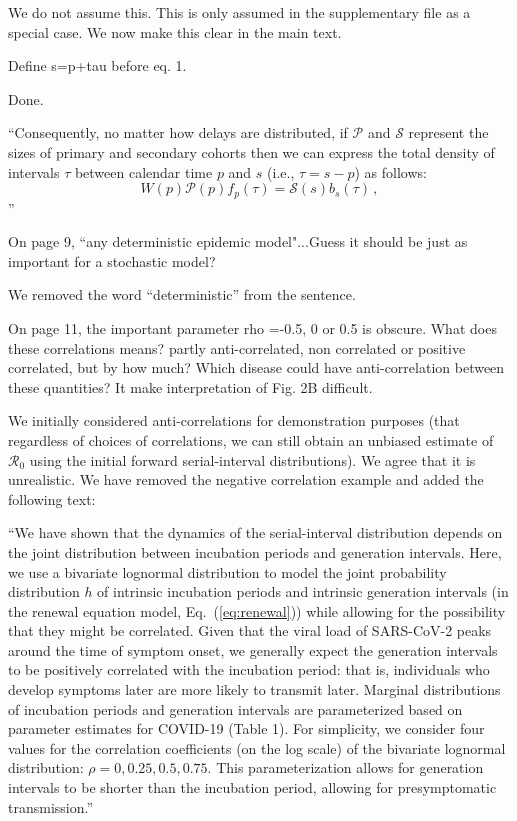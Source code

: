 \documentclass[12pt]{article}
\newcommand{\eref}[1]{Eq.~(\ref{eq:#1})}
\newcommand{\Ro}{\ensuremath{{\mathcal R}_{0}}\xspace}
\newcommand{\revtext}{\textsf}
\newcommand{\psymp}{\ensuremath{p}} %
\newcommand{\ssymp}{\ensuremath{s}} %
\newcommand{\psize}{{\mathcal P}} %
\newcommand{\ssize}{{\mathcal S}} %
\begin{document}
We do not assume this. This is only assumed in the supplementary file as a special case. We now make this clear in the main text.

\revtext{Define s=p+tau before eq. 1.}

Done.

``Consequently, no matter how delays are distributed, if
$\mathcal P$ and $\mathcal S$ represent the sizes of primary and
secondary cohorts then we can express the total density of intervals $\tau$ between calendar time $\psymp$ and $\ssymp$ (i.e., $\tau=\ssymp-\psymp$) as follows:
\begin{equation}
W(\psymp) \psize(\psymp) f_\psymp(\tau) = \ssize(\ssymp) b_\ssymp(\tau) \,,
\label{eq:match}
\end{equation}''

\revtext{On page 9, ``any deterministic epidemic model"...Guess it should be just as important for a stochastic model?}

We removed the word ``deterministic'' from the sentence.

\revtext{On page 11, the important parameter rho =-0.5, 0 or 0.5 is obscure. What does these correlations means? partly anti-correlated, non correlated or positive correlated, but by how much? Which disease could have anti-correlation between these quantities? It make interpretation of Fig. 2B difficult. }

We initially considered anti-correlations for demonstration purposes (that regardless of choices of correlations, we can still obtain an unbiased estimate of \Ro using the initial forward serial-interval distributions). We agree that it is unrealistic. We have removed the negative correlation example and added the following text:

``We have shown that the dynamics of the serial-interval distribution depends on the joint distribution between incubation periods and generation intervals.
Here, we use a bivariate lognormal distribution to model the joint probability distribution $h$ of intrinsic incubation periods and intrinsic generation intervals (in the renewal equation model, \eref{renewal}) while allowing for the possibility that they might be correlated.
Given that the viral load of SARS-CoV-2 peaks around the time of symptom onset, we generally expect the generation intervals to be positively correlated with the incubation period:
that is, individuals who develop symptoms later are more likely to transmit later.
Marginal distributions of incubation periods and generation intervals are parameterized based on parameter estimates for COVID-19 (Table 1).
For simplicity, we consider four values for the correlation coefficients (on the log scale) of the bivariate lognormal distribution: $\rho = 0, 0.25, 0.5, 0.75$.
This parameterization allows for generation intervals to be shorter than the incubation period, allowing for presymptomatic transmission.''
\end{document}
